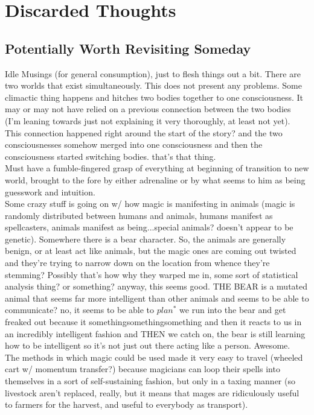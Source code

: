 \chapter*{Discarded Thoughts}

\section*{Potentially Worth Revisiting Someday}

Idle Musings (for general consumption), just to flesh things out a bit.  There are two worlds that exist simultaneously. This does not present any problems.  Some climactic thing happens and hitches two bodies together to one consciousness.  It may or may not have relied on a previous connection between the two bodies (I'm leaning towards just not explaining it very thoroughly, at least not yet). This connection happened right around the start of the story? and the two consciousnesses somehow merged into one consciousness and then the consciousness started switching bodies. that's that thing. \\


Must have a fumble-fingered grasp of everything at beginning of transition to new world, brought to the fore by either adrenaline or by what seems to him as being guesswork and intuition. \\

Some crazy stuff is going on w/ how magic is manifesting in animals (magic is randomly distributed between humans and animals, humans manifest as spellcasters, animals manifest as being...special animals? doesn't appear to be genetic).  Somewhere there is a bear character.  So, the animals are generally benign, or at least act like animals, but the magic ones are coming out twisted and they're trying to narrow down on the location from whence they're stemming?  Possibly that's how why they warped me in, some sort of statistical analysis thing? or something? anyway, this seems good. THE BEAR is a mutated animal that seems far more intelligent than other animals and seems to be able to communicate? no, it seems to be able to $plan^*$ we run into the bear and get freaked out because it somethingsomethingsomething and then it reacts to us in an incredibly intelligent fashion and THEN we catch on, the bear is still learning how to be intelligent so it's not just out there acting like a person. Awesome. \\

The methods in which magic could be used made it very easy to travel (wheeled cart w/ momentum transfer?) because magicians can loop their spells into themselves in a sort of self-sustaining fashion, but only in a taxing manner (so livestock aren't replaced, really, but it means that mages are ridiculously useful to farmers for the harvest, and useful to everybody as transport).

